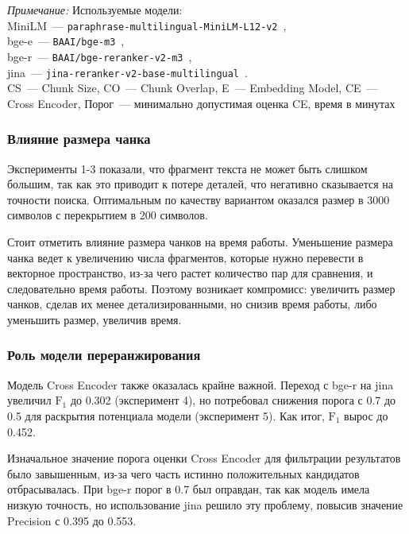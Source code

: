 \begin{table}[H]
    \vspace{1ex}
    \raggedright\footnotesize
    \textit{Примечание:} Используемые модели: \\
    MiniLM~--- \texttt{paraphrase-multilingual-MiniLM-L12-v2}~\cite{minilm_v2}, \\
    bge-e~--- \texttt{BAAI/bge-m3}~\cite{bge_m3}, \\
    bge-r~--- \texttt{BAAI/bge-reranker-v2-m3}~\cite{bge_reranker_v2}, \\
    jina~--- \texttt{jina-reranker-v2-base-multilingual}~\cite{jina_reranker_v2}. \\
    CS~--- Chunk Size, CO~--- Chunk Overlap,
    E~--- Embedding Model, CE~--- Cross Encoder, Порог~--- минимально допустимая оценка CE,
    время в минутах
\end{table}

\subsubsection*{Влияние размера чанка}
Эксперименты 1-3 показали, что фрагмент текста не может быть слишком большим,
так как это приводит к потере деталей, что негативно сказывается на точности поиска.
Оптимальным по качеству вариантом оказался размер в 3000 символов с перекрытием в 200 символов.

Стоит отметить влияние размера чанков на время работы.
Уменьшение размера чанка ведет к увеличению числа
фрагментов, которые нужно перевести в векторное пространство,
из-за чего растет количество пар для сравнения,
и следовательно время работы.
Поэтому возникает компромисс:
увеличить размер чанков, сделав их менее детализированными, но снизив время работы,
либо уменьшить размер, увеличив время.

\subsubsection*{Роль модели переранжирования}
Модель Cross Encoder также оказалась крайне важной.
Переход с bge-r на jina увеличил $\text{F}_1$ до 0.302 (эксперимент 4),
но потребовал снижения порога с 0.7 до 0.5 для раскрытия потенциала модели (эксперимент 5).
Как итог, $\text{F}_1$ вырос до 0.452.

Изначальное значение порога оценки Cross Encoder для фильтрации результатов
было завышенным, из-за чего
часть истинно положительных кандидатов отбрасывалась.
При bge-r порог в 0.7 был оправдан, так как
модель имела низкую точность, но использование jina
решило эту проблему, повысив значение Precision с 0.395 до 0.553.

